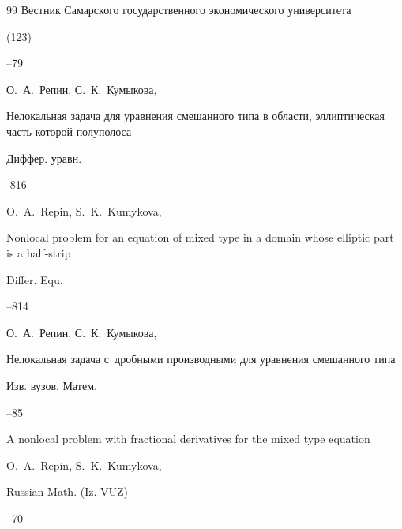 \begin{thebibliography}{99}
\jour Вестник Самарского государственного экономического университета


(123)

--79






\by О.~А.~Репин, С.~К.~Кумыкова,

\paper  Нелокальная задача для уравнения смешанного типа в области, эллиптическая часть которой полуполоса 

\jour Диффер. уравн.




-816

\transl 

\by O.~A.~Repin, S.~K.~Kumykova, 

\paper Nonlocal problem for an equation of mixed type in a domain whose elliptic part is a half-strip

\jour Differ. Equ. 



--814 






\by О.~А.~Репин, С.~К.~Кумыкова,

\paper Нелокальная задача с~дробными производными для уравнения смешанного типа

\jour Изв. вузов. Матем.



--85


\transl

\paper A nonlocal problem with fractional derivatives for the mixed type equation

\by O.~A.~Repin, S.~K.~Kumykova, 

\jour Russian Math. (Iz. VUZ)




--70


\end{thebibliography}
